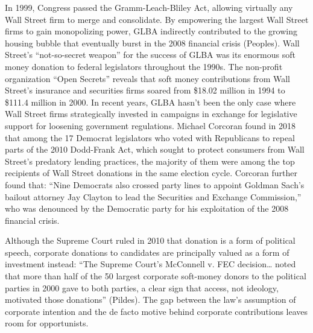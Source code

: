 In 1999, Congress passed the Gramm-Leach-Bliley Act, allowing virtually any Wall Street firm to merge and consolidate. By empowering the largest Wall Street firms to gain monopolizing power, GLBA indirectly contributed to the growing housing bubble that eventually burst in the 2008 financial crisis (Peoples). Wall Street’s “not-so-secret weapon” for the success of GLBA was its enormous soft money donation to federal legislators throughout the 1990s. The non-profit organization “Open Secrets” reveals that soft money contributions from Wall Street’s insurance and securities firms soared from \$18.02 million in 1994 to \$111.4 million in 2000. In recent years, GLBA hasn’t been the only case where Wall Street firms strategically invested in campaigns in exchange for legislative support for loosening government regulations. Michael Corcoran found in 2018 that among the 17 Democrat legislators who voted with Republicans to repeal parts of the 2010 Dodd-Frank Act, which sought to protect consumers from Wall Street’s predatory lending practices, the majority of them were among the top recipients of Wall Street donations in the same election cycle. Corcoran further found that: “Nine Democrats also crossed party lines to appoint Goldman Sach’s bailout attorney Jay Clayton to lead the Securities and Exchange Commission,” who was denounced by the Democratic party for his exploitation of the 2008 financial crisis. 

Although the Supreme Court ruled in 2010 that donation is a form of political speech, corporate donations to candidates are principally valued as a form of investment instead: “The Supreme Court’s McConnell v. FEC decision… noted that more than half of the 50 largest corporate soft-money donors to the political parties in 2000 gave to both parties, a clear sign that access, not ideology, motivated those donations” (Pildes). The gap between the law’s assumption of corporate intention and the de facto motive behind corporate contributions leaves room for opportunists. 

